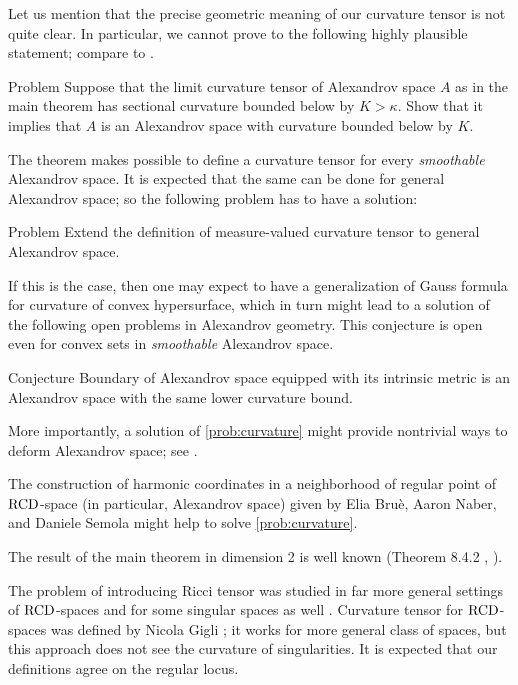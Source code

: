 Let us mention that the precise geometric meaning of our curvature tensor is not quite clear. 
In particular, we cannot prove to the following highly plausible statement; compare to \cite[Conjecture~1.1]{G}.

\begin{thm}{Problem}
Suppose that the limit curvature tensor of Alexandrov space $A$ as in the main theorem has sectional curvature bounded below by $K>\kappa$.
Show that it implies that $A$ is an Alexandrov space with curvature bounded below by $K$.
\end{thm}

The theorem makes possible to define a curvature tensor for every \emph{smoothable} Alexandrov space.
It is expected that the same can be done for general Alexandrov space; so the following problem has to have a solution:

\begin{thm}{Problem}\label{prob:curvature}
Extend the definition of measure-valued curvature tensor to general Alexandrov space.
\end{thm}

If this is the case, then one may expect to have a generalization of Gauss formula for curvature of convex hypersurface, which in turn might lead to a solution of the following open problems in Alexandrov geometry.
This conjecture is open even for convex sets in \emph{smoothable} Alexandrov space.

\begin{thm}{Conjecture}
Boundary of Alexandrov space equipped with its intrinsic metric is an Alexandrov space with the same lower curvature bound.
\end{thm}

More importantly, a solution of \ref{prob:curvature} might provide nontrivial ways to deform Alexandrov space; see \cite[Section 9]{petrunin-conc}. 

The construction of harmonic coordinates in a neighborhood of regular point of $\operatorname{RCD}$-space (in particular, Alexandrov space) given by Elia Bruè, Aaron Naber, and Daniele Semola \cite{BNS} might help to solve \ref{prob:curvature}.

The result of the main theorem in dimension 2 is well known (Theorem 8.4.2 \cite{Resh}, \cite{AZ}).

The problem of introducing Ricci tensor
was studied in far more general settings of 
 $\operatorname{RCD}$-spaces \cite{G1,St,H}
 and
for some singular  spaces as well \cite{L}.
Curvature tensor for  $\operatorname{RCD}$-spaces was defined by Nicola Gigli \cite{G};
it works for more general class of spaces, but this approach does not see the curvature of singularities.
It is expected that our definitions agree on the regular locus.

